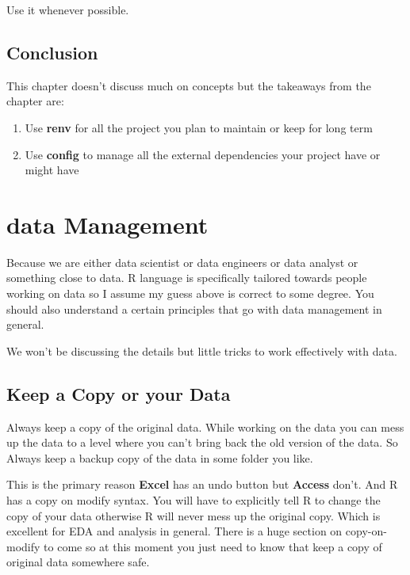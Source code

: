 \documentclass[
]{book}
\providecommand{\tightlist}{%
  \setlength{\itemsep}{0pt}\setlength{\parskip}{0pt}}
\begin{document}
Use it whenever possible.

\hypertarget{conclusion-3}{%
\section{Conclusion}\label{conclusion-3}}

This chapter doesn't discuss much on concepts but the takeaways from the chapter are:

\begin{enumerate}
\def\labelenumi{\arabic{enumi}.}
\tightlist
\item
  Use \textbf{renv} for all the project you plan to maintain or keep for long term
\item
  Use \textbf{config} to manage all the external dependencies your project have or might have
\end{enumerate}

\hypertarget{dataManagement}{%
\chapter{data Management}\label{dataManagement}}

Because we are either data scientist or data engineers or data analyst or something close to data. R language is specifically tailored towards people working on data so I assume my guess above is correct to some degree. You should also understand a certain principles that go with data management in general.

We won't be discussing the details but little tricks to work effectively with data.

\hypertarget{keep-a-copy-or-your-data}{%
\section{Keep a Copy or your Data}\label{keep-a-copy-or-your-data}}

Always keep a copy of the original data. While working on the data you can mess up the data to a level where you can't bring back the old version of the data. So Always keep a backup copy of the data in some folder you like.

This is the primary reason \textbf{Excel} has an undo button but \textbf{Access} don't. And R has a copy on modify syntax. You will have to explicitly tell R to change the copy of your data otherwise R will never mess up the original copy. Which is excellent for EDA and analysis in general. There is a huge section on copy-on-modify to come so at this moment you just need to know that keep a copy of original data somewhere safe.
\end{document}
